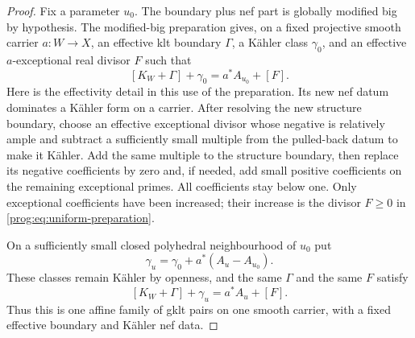 \begin{proof}
Fix a parameter $u_0$. The boundary plus nef part is globally
modified big by hypothesis. The modified-big preparation
\cite[Lemma~2.23]{HX} gives, on a fixed projective smooth carrier
$a:W\to X$, an effective klt boundary $\Gamma$, a K\"ahler class
$\gamma_0$, and an effective $a$-exceptional real divisor $F$ such that
\begin{equation}\label{prog:eq:uniform-preparation}
             [K_W+\Gamma]+\gamma_0=a^*A_{u_0}+[F].
\end{equation}
Here is the effectivity detail in this use of the preparation. Its new
nef datum dominates a K\"ahler form on a carrier. After resolving the
new structure boundary, choose an effective exceptional divisor whose
negative is relatively ample and subtract a sufficiently small multiple
from the pulled-back datum to make it K\"ahler. Add the same multiple
to the structure boundary,
then replace its negative coefficients by zero and, if needed, add
small positive coefficients on the remaining exceptional primes.
All coefficients stay below one. Only exceptional coefficients have
been increased; their increase is the divisor $F\geq0$ in
\eqref{prog:eq:uniform-preparation}.

On a sufficiently small closed polyhedral neighbourhood of $u_0$ put
\[
                \gamma_u=\gamma_0+a^*(A_u-A_{u_0}).
\]
These classes remain K\"ahler by openness, and the same $\Gamma$ and
the same $F$ satisfy
\[
                  [K_W+\Gamma]+\gamma_u=a^*A_u+[F].
\]
Thus this is one affine family of gklt pairs on one smooth carrier,
with a fixed effective boundary and K\"ahler nef data.


\end{proof}

